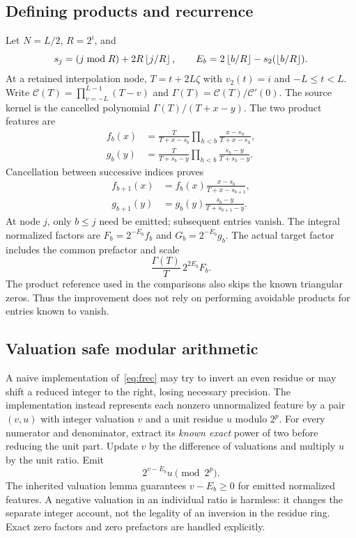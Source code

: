 \documentclass[11pt,letterpaper]{article}
\theoremstyle{remark}\newtheorem{remark}[theorem]{Remark}
\begin{document}
\subsection{Defining products and recurrence}
Let $N=L/2$, $R=2^i$, and
\[
 s_j=(j\bmod R)+2R\left\lfloor j/R\right\rfloor,\qquad
 E_b=2\left\lfloor b/R\right\rfloor-s_2(\left\lfloor b/R\right\rfloor).
\]
At a retained interpolation node, $T=t+2L\zeta$ with $v_2(t)=i$ and $-L\le t<L$. Write $\mathcal C(T)=\prod_{v=-L}^{L-1}(T-v)$ and $\Gamma(T)=\mathcal C(T)/\mathcal C'(0)$. The source kernel is the cancelled polynomial $\Gamma(T)/(T+x-y)$. The two product features are
\begin{align}
 f_b(x)&=\frac{T}{T+x-s_b}\prod_{h<b}\frac{x-s_h}{T+x-s_h},\label{eq:fprod}\\
 g_b(y)&=\frac{T}{T+s_b-y}\prod_{h<b}\frac{s_h-y}{T+s_h-y}.\label{eq:gprod}
\end{align}
Cancellation between successive indices proves
\begin{align}
 f_{b+1}(x)&=f_b(x)\frac{x-s_b}{T+x-s_{b+1}},\label{eq:frec}\\
 g_{b+1}(y)&=g_b(y)\frac{s_b-y}{T+s_{b+1}-y}.\label{eq:grec}
\end{align}
At node $j$, only $b\le j$ need be emitted; subsequent entries vanish. The integral normalized factors are $F_b=2^{-E_b}f_b$ and $G_b=2^{-E_b}g_b$. The actual target factor includes the common prefactor and scale
\[
 \frac{\Gamma(T)}T\,2^{2E_b}F_b.
\]
The product reference used in the comparisons also skips the known triangular zeros. Thus the improvement does not rely on performing avoidable products for entries known to vanish.

\subsection{Valuation safe modular arithmetic}
A naive implementation of~\eqref{eq:frec} may try to invert an even residue or may shift a reduced integer to the right, losing necessary precision. The implementation instead represents each nonzero unnormalized feature by a pair $(v,u)$ with integer valuation $v$ and a unit residue $u$ modulo $2^p$. For every numerator and denominator, extract its \emph{known exact} power of two before reducing the unit part. Update $v$ by the difference of valuations and multiply $u$ by the unit ratio. Emit
\[
 2^{v-E_b}u\pmod{2^p}.
\]
The inherited valuation lemma guarantees $v-E_b\ge0$ for emitted normalized features. A negative valuation in an individual ratio is harmless: it changes the separate integer account, not the legality of an inversion in the residue ring. Exact zero factors and zero prefactors are handled explicitly.
\end{document}
